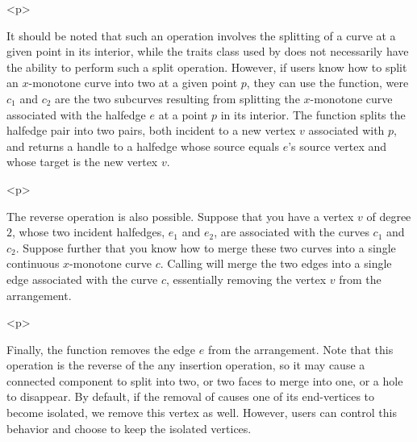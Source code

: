 \begin{ccHtmlOnly}<p>\end{ccHtmlOnly}
It should be noted that such an operation involves the splitting
of a curve at a given point in its interior, while the traits
class used by  does not necessarily have the
ability to perform such a split operation. However, if users know
how to split an $x$-monotone curve into two at a given point $p$,
they can use the  function, were
$c_1$ and $c_2$ are the two subcurves resulting from splitting the
$x$-monotone curve associated with the halfedge $e$ at a point $p$
in its interior. The function splits the halfedge pair into two
pairs, both incident to a new vertex $v$ associated with $p$, and
returns a handle to a halfedge whose source equals $e$'s source
vertex and whose target is the new vertex $v$.

\begin{ccHtmlOnly}<p>\end{ccHtmlOnly}
The reverse operation is also possible. Suppose that you have a
vertex $v$ of degree $2$, whose two incident halfedges, $e_1$ and
$e_2$, are associated with the curves $c_1$ and $c_2$. Suppose
further that you know how to merge these two curves into a single
continuous $x$-monotone curve $c$. Calling 
will merge the two edges into a single edge associated with the curve
$c$, essentially removing the vertex $v$ from the arrangement.

\begin{ccHtmlOnly}<p>\end{ccHtmlOnly}
Finally, the function  removes the edge $e$
from the arrangement. Note that this operation is the reverse of
the any insertion operation, so it may cause a connected
component to split into two, or two faces to merge into one, or a
hole to disappear. By default, if the removal of  causes one
of its end-vertices to become isolated, we remove this vertex as well.
However, users can control this behavior and choose to keep the
isolated vertices.

